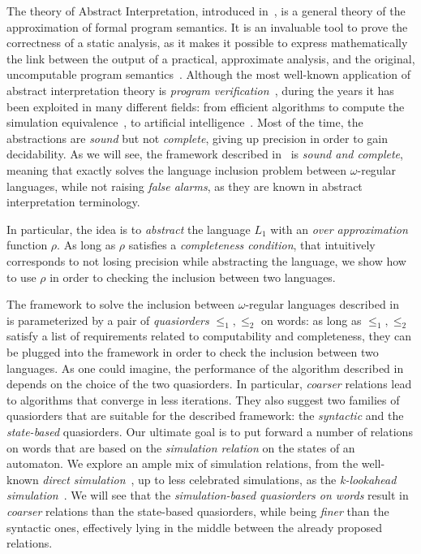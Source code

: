 The theory of Abstract Interpretation, introduced in~\cite{cousot1977abstract},
is a general theory of the approximation of formal program semantics.
It is an invaluable tool to prove the correctness of a static analysis,
as it makes it possible to express mathematically the link between the
output of a practical, approximate analysis, and the original,
uncomputable program semantics~\cite{mine2017tutorial}.
Although the most well-known application of abstract interpretation theory
is \emph{program verification}~\cite{cousot2005astree},
during the years it has been exploited in
many different fields: from efficient algorithms to compute the simulation
equivalence~\cite{ranzato2007new}, to artificial
intelligence~\cite{ranzato2019robustness}.
Most of the time, the abstractions are \emph{sound} but not \emph{complete},
giving up precision in order to gain decidability.
As we will see, the framework described in~\cite{ganty2020omegalang} is
\emph{sound and complete}, meaning that exactly solves the language inclusion
problem between $\omega$-regular languages, while not raising \emph{false alarms},
as they are known in abstract interpretation terminology.

In particular, the idea is to \emph{abstract} the language $L_1$ with
an \emph{over approximation} function $\rho$.
As long as $\rho$ satisfies a \emph{completeness condition}, that intuitively
corresponds to not losing precision while abstracting the language,
we show how to use $\rho$ in order to checking the inclusion between two languages.

The framework to solve the inclusion between $\omega$-regular languages
described in~\cite{ganty2020omegalang}
is parameterized by a pair of \emph{quasiorders} $\leq_1, \leq_2$ on words:
as long as $\leq_1,\leq_2$ satisfy a list of requirements related to computability
and completeness, they can be plugged into the framework in order to check
the inclusion between two languages.
As one could imagine, the performance of the algorithm described
in~\cite{ganty2020omegalang} depends on the choice of the two quasiorders.
In particular, \emph{coarser} relations lead to algorithms that converge in
less iterations.
They also suggest two families of quasiorders that are suitable for
the described framework: the \emph{syntactic} and the \emph{state-based} quasiorders.
Our ultimate goal is to put forward a number of relations on words that are based on
the \emph{simulation relation} on the states of an automaton.
We explore an ample mix of simulation relations, from the well-known
\emph{direct simulation}~\cite{dill1991checking}, up to less celebrated simulations,
as the \emph{k-lookahead simulation}~\cite{clemente2017efficient}.
We will see that the \emph{simulation-based quasiorders on words} result in
\emph{coarser} relations than the state-based quasiorders, while being
\emph{finer} than the syntactic ones, effectively lying in
the middle between the already proposed relations.

